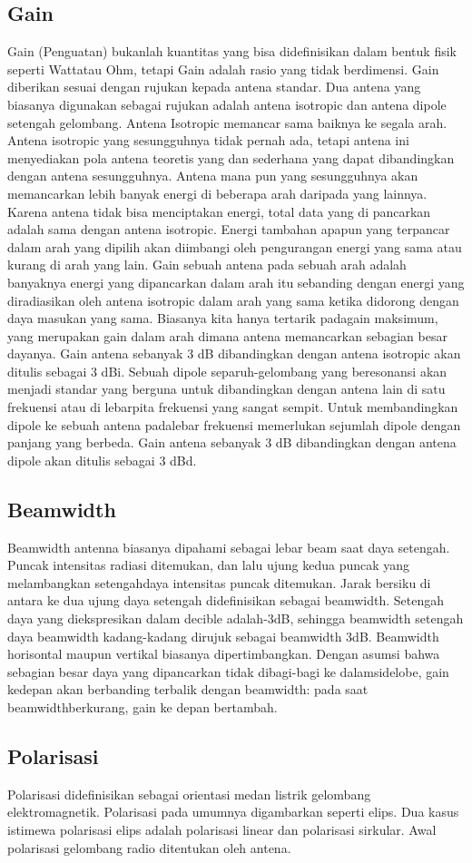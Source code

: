 \documentclass[a4paper,12pt]{article}
\begin{document}
\subsection{Gain}
Gain (Penguatan) bukanlah kuantitas yang bisa didefinisikan dalam bentuk fisik seperti Wattatau Ohm, tetapi Gain adalah rasio yang tidak berdimensi. Gain
diberikan sesuai dengan rujukan kepada antena standar. Dua antena yang biasanya digunakan sebagai rujukan adalah antena isotropic dan antena dipole
setengah gelombang. Antena Isotropic memancar sama baiknya ke segala arah. Antena isotropic yang sesungguhnya tidak pernah ada, tetapi antena ini menyediakan 
pola antena teoretis yang dan sederhana yang dapat dibandingkan dengan antena sesungguhnya. Antena mana pun yang sesungguhnya akan memancarkan lebih banyak energi
di beberapa arah daripada yang lainnya. Karena antena tidak bisa menciptakan energi, total data yang di pancarkan adalah sama dengan antena isotropic. Energi
tambahan apapun yang terpancar dalam arah yang dipilih akan diimbangi oleh pengurangan energi yang sama atau kurang di arah yang lain. Gain sebuah antena pada
sebuah arah adalah banyaknya energi yang dipancarkan dalam arah itu sebanding dengan energi yang diradiasikan oleh antena isotropic dalam arah yang sama ketika 
didorong dengan daya masukan yang sama. Biasanya kita hanya tertarik padagain maksimum, yang merupakan gain dalam arah dimana antena memancarkan sebagian besar
dayanya. Gain antena sebanyak 3 dB dibandingkan dengan antena isotropic akan ditulis sebagai 3 dBi.  Sebuah dipole separuh-gelombang yang beresonansi akan
menjadi standar yang berguna untuk dibandingkan dengan antena lain di satu frekuensi atau di lebarpita frekuensi yang sangat sempit. Untuk membandingkan dipole ke
sebuah antena padalebar frekuensi memerlukan sejumlah dipole dengan panjang yang berbeda. Gain antena sebanyak 3 dB dibandingkan dengan antena dipole akan ditulis
sebagai 3 dBd.

\subsection{Beamwidth}
Beamwidth  antenna biasanya dipahami sebagai lebar beam saat daya setengah. Puncak intensitas radiasi ditemukan, dan
lalu ujung kedua puncak yang melambangkan setengahdaya intensitas puncak ditemukan. Jarak bersiku di antara ke dua ujung
daya setengah didefinisikan sebagai beamwidth. Setengah daya yang diekspresikan dalam decible adalah-3dB, sehingga
beamwidth setengah daya beamwidth kadang-kadang dirujuk sebagai beamwidth 3dB. Beamwidth horisontal maupun
vertikal biasanya dipertimbangkan. Dengan asumsi bahwa sebagian besar daya yang dipancarkan tidak dibagi-bagi ke
dalamsidelobe,  gain kedepan akan berbanding terbalik dengan beamwidth: pada saat beamwidthberkurang, gain ke depan
bertambah.

\subsection{Polarisasi}
Polarisasi didefinisikan sebagai orientasi medan listrik gelombang elektromagnetik. Polarisasi pada umumnya
digambarkan seperti elips. Dua kasus istimewa polarisasi elips adalah polarisasi linear dan polarisasi sirkular. Awal
polarisasi gelombang radio ditentukan oleh antena.
\end{document}
